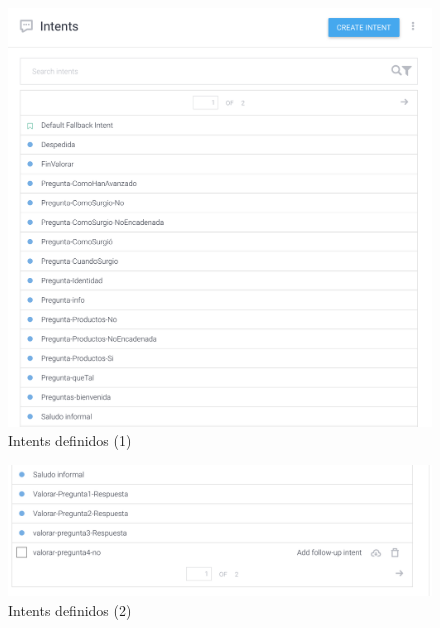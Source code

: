 \begin{figure}[H] %
	\centering
	\includegraphics[scale=0.3]{imagenes/intents1.png}  %
	\caption{Intents definidos (1)}
\end{figure}

\begin{figure}[H] %
	\centering
	\includegraphics[scale=0.3]{imagenes/intents2.png}  %
	\caption{Intents definidos (2)}
\end{figure}

